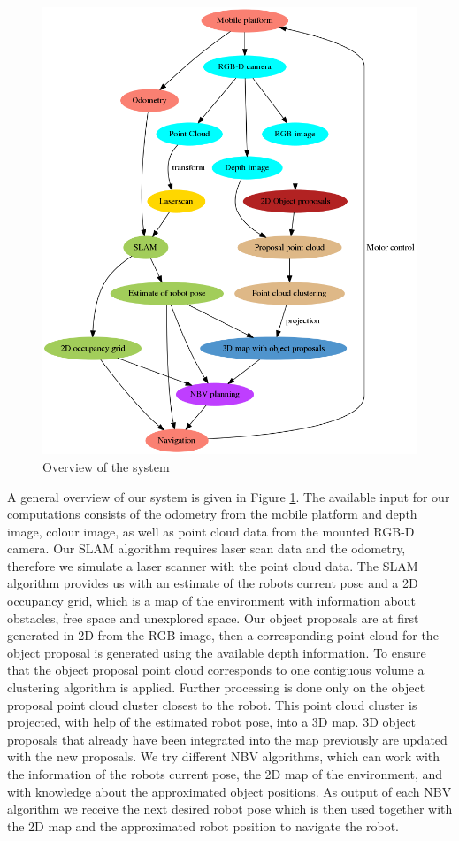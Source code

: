 \documentclass[a4paper,11pt,english]{article}
\begin{document}
\begin{figure}
	\begin{center}
		\includegraphics[width=1\linewidth]{dot/overview.png} 
		\caption{Overview of the system}
		\label{fig:overview}
	\end{center}
\end{figure}

A general overview of our system is given in Figure \ref{fig:overview}.
The available input for our computations consists of the odometry from the mobile platform and depth image, colour image, as well as point cloud data from the mounted RGB-D camera. Our SLAM algorithm requires laser scan data and the odometry, therefore we simulate a laser scanner with the point cloud data.
The SLAM algorithm provides us with an estimate of the robots current pose and a 2D occupancy grid, which is a map of the environment with information about obstacles, free space and unexplored space. 
Our object proposals are at first generated in 2D from the RGB image, then a corresponding point cloud for the object proposal is generated using the available depth information. To ensure that the object proposal point cloud corresponds to one contiguous volume a clustering algorithm is applied. Further processing is done only on the object proposal point cloud cluster closest to the robot. 
This point cloud cluster is projected, with help of the estimated robot pose, into a 3D map.
3D object proposals that already have been integrated into the map previously are updated with the new proposals.
We try different NBV algorithms, which can work with the information of the robots current pose, the 2D map of the environment, and with knowledge about the approximated object positions.
As output of each NBV algorithm we receive the next desired robot pose which is then used together with the 2D map and the approximated robot position to navigate the robot.
\end{document}
